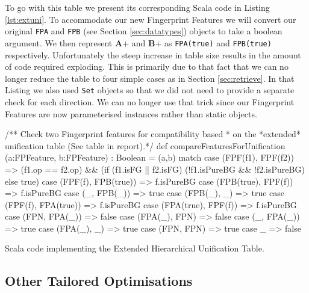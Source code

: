 To go with this table we present its corresponding Scala code in Listing \ref{lst:extuni}.
To accommodate our new Fingerprint Features we will convert our original \verb!FPA! and \verb!FPB!
(see Section \ref{sec:datatypes}) objects to take a boolean argument.
We then represent \textbf{A}+ and \textbf{B}+ as \verb!FPA(true)! and \verb!FPB(true)! respectively.
Unfortunately the steep increase in table size results in the amount of code required exploding.
This is primarily due to that fact that we can no longer reduce the table to four
simple cases as in Section \ref{sec:retrieve}. In that Listing we also
used \verb!Set! objects so that we did not need to provide a separate check for each
direction. We can no longer use that trick since our Fingerprint Features are now
parameterised instances rather than static objects.
\begin{listing}[H]
\begin{scalacode}
 /** Check two Fingerprint features for compatibility based
   * on the *extended* unification table (See table in report).*/
  def compareFeaturesForUnification
      (a:FPFeature, b:FPFeature) : Boolean = 
  (a,b) match {
    case (FPF(f1), FPF(f2))    => (f1.op == f2.op) && 
                                  (if (f1.isFG || f2.isFG) 
                                      (!f1.isPureBG && !f2.isPureBG)
                                   else true)
    case (FPF(f), FPB(true)) => f.isPureBG
    case (FPB(true), FPF(f)) => f.isPureBG
    case (_, FPB(_))         => true
    case (FPB(_), _)         => true
    case (FPF(f), FPA(true)) => f.isPureBG
    case (FPA(true), FPF(f)) => f.isPureBG
    case (FPN, FPA(_))       => false
    case (FPA(_), FPN)       => false
    case (_, FPA(_))         => true
    case (FPA(_), _)         => true
    case (FPN, FPN)          => true
    case _                   => false
  }
\end{scalacode}
\caption{Scala code implementing the Extended Hierarchical Unification Table.}
\label{lst:extuni}
\end{listing}


\subsection{Other Tailored Optimisations}
\label{sec:otherimp}


